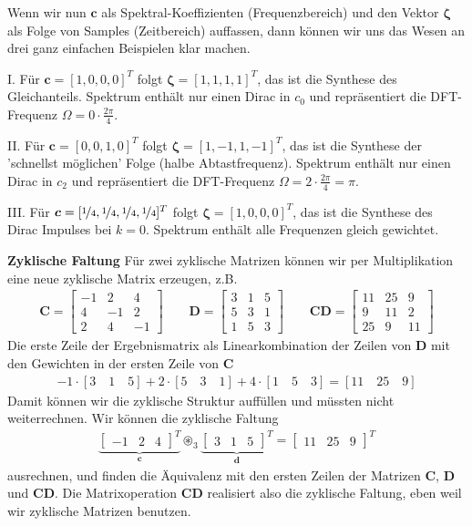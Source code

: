 Wenn wir nun $\bm{c}$ als Spektral-Koeffizienten (Frequenzbereich) und
den Vektor $\bm{\zeta}$ als Folge von Samples (Zeitbereich) auffassen,
dann können wir uns das Wesen an drei ganz einfachen Beispielen klar machen.

I. Für $\bm{c} = [1,0,0,0]^T$ folgt $\bm{\zeta} = [1,1,1,1]^T$,
das ist die Synthese des Gleichanteils. Spektrum enthält nur einen Dirac in $c_0$
und repräsentiert die DFT-Frequenz $\Omega = 0 \cdot \frac{2\pi}{4}$.

II. Für $\bm{c} = [0,0,1,0]^T$ folgt $\bm{\zeta} = [1,-1,1,-1]^T$,
das ist die Synthese der 'schnellst möglichen' Folge (halbe Abtastfrequenz).
Spektrum enthält nur einen Dirac in $c_2$
und repräsentiert die DFT-Frequenz $\Omega = 2 \cdot \frac{2\pi}{4} = \pi$.

III. Für $\bm{c} = [\nicefrac{1}{4},\nicefrac{1}{4},\nicefrac{1}{4},\nicefrac{1}{4}]^T$
folgt $\bm{\zeta} = [1,0,0,0]^T$,
das ist die Synthese des Dirac Impulses bei $k=0$.
Spektrum enthält alle Frequenzen gleich gewichtet.

\textbf{Zyklische Faltung}
Für zwei zyklische Matrizen können wir per Multiplikation eine
neue zyklische Matrix erzeugen, z.B.
\begin{align}
\bm{C} =
\begin{bmatrix}
-1 & 2 & 4 \\
4 & -1 & 2 \\
2 & 4 & -1
\end{bmatrix}
\qquad
\bm{D} =
\begin{bmatrix}
3 & 1 & 5\\
5 & 3 & 1 \\
1 & 5 & 3
\end{bmatrix}
\qquad
\bm{C}\bm{D} =
\begin{bmatrix}
11 & 25 & 9\\
9 &  11&  2\\
25 &  9&  11
\end{bmatrix}
\end{align}
Die erste Zeile der Ergebnismatrix als Linearkombination der
Zeilen von $\bm{D}$ mit den Gewichten in der ersten Zeile von $\bm{C}$
\begin{align}
\label{eq:C8864C8D9F_LinComb_Row}
-1 \cdot [3 \quad 1 \quad 5] + 2 \cdot [5 \quad 3 \quad 1] + 4 \cdot [1 \quad 5 \quad 3] =
[11 \quad 25 \quad 9]
\end{align}
Damit können wir die zyklische Struktur auffüllen und müssten nicht
weiterrechnen.
%
Wir können die zyklische Faltung
\begin{align}
\underbrace{
\begin{bmatrix}
-1 & 2 & 4
\end{bmatrix}^T}_{\bm{c}}
\circledast_3
\underbrace{
\begin{bmatrix}
3 & 1 & 5
\end{bmatrix}^T}_{\bm{d}}
=
\begin{bmatrix}
11 & 25 & 9
\end{bmatrix}^T
\end{align}
ausrechnen, und finden die Äquivalenz mit den ersten Zeilen der Matrizen
$\bm{C}$, $\bm{D}$ und $\bm{C} \bm{D}$. Die Matrixoperation $\bm{C} \bm{D}$
realisiert also die zyklische Faltung,
eben weil wir zyklische Matrizen benutzen.

